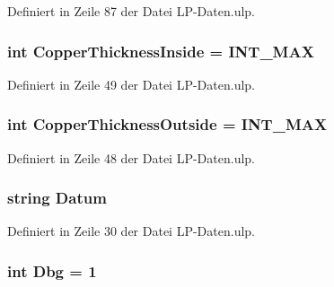 Definiert in Zeile 87 der Datei L\+P-\/\+Daten.\+ulp.

\hypertarget{_l_p-_daten_8ulp_aeeba5b9f7a94fe76ac9dc01647a293ff}{}
\subsubsection[{Copper\+Thickness\+Inside}]{\setlength{\rightskip}{0pt plus 5cm}int Copper\+Thickness\+Inside = I\+N\+T\+\_\+\+M\+A\+X}\label{_l_p-_daten_8ulp_aeeba5b9f7a94fe76ac9dc01647a293ff}


Definiert in Zeile 49 der Datei L\+P-\/\+Daten.\+ulp.

\hypertarget{_l_p-_daten_8ulp_a326dc1deac8160555dd3d7d159007be3}{}
\subsubsection[{Copper\+Thickness\+Outside}]{\setlength{\rightskip}{0pt plus 5cm}int Copper\+Thickness\+Outside = I\+N\+T\+\_\+\+M\+A\+X}\label{_l_p-_daten_8ulp_a326dc1deac8160555dd3d7d159007be3}


Definiert in Zeile 48 der Datei L\+P-\/\+Daten.\+ulp.

\hypertarget{_l_p-_daten_8ulp_a56c3cee34ae375ca5905f9888799632f}{}
\subsubsection[{Datum}]{\setlength{\rightskip}{0pt plus 5cm}string Datum}\label{_l_p-_daten_8ulp_a56c3cee34ae375ca5905f9888799632f}


Definiert in Zeile 30 der Datei L\+P-\/\+Daten.\+ulp.

\hypertarget{_l_p-_daten_8ulp_ae22172296e8719c35db905a207fcdb56}{}
\subsubsection[{Dbg}]{\setlength{\rightskip}{0pt plus 5cm}int Dbg = 1}\label{_l_p-_daten_8ulp_ae22172296e8719c35db905a207fcdb56}


